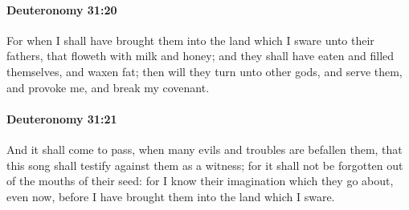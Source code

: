 		\paragraph{Deuteronomy 31:20} %
			\label{DEUTERONOMY-31-20}

			For when I shall have brought them into the land which I sware unto their fathers, that floweth with milk and honey; and they shall have eaten and filled themselves, and waxen fat; then will they turn unto other gods, and serve them, and provoke me, and break my covenant.


		\paragraph{Deuteronomy 31:21} %
			\label{DEUTERONOMY-31-21}

			And it shall come to pass, when many evils and troubles are befallen them, that this song shall testify against them as a witness; for it shall not be forgotten out of the mouths of their seed: for I know their imagination which they go about, even now, before I have brought them into the land which I sware.

